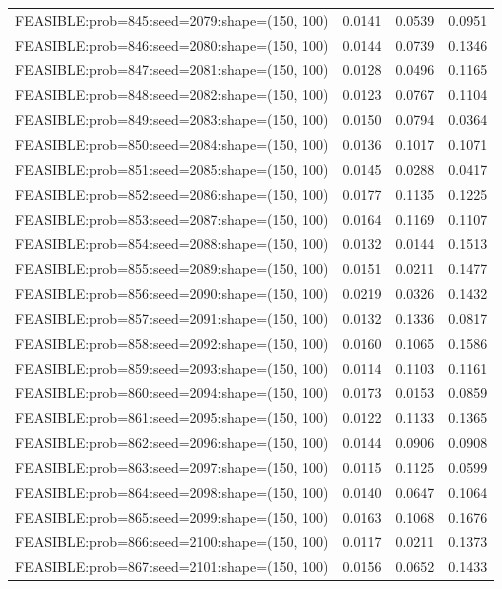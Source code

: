\begin{longtable}{lccc}
FEASIBLE:prob=845:seed=2079:shape=(150, 100) & 0.0141 & 0.0539 & 0.0951 \\
FEASIBLE:prob=846:seed=2080:shape=(150, 100) & 0.0144 & 0.0739 & 0.1346 \\
FEASIBLE:prob=847:seed=2081:shape=(150, 100) & 0.0128 & 0.0496 & 0.1165 \\
FEASIBLE:prob=848:seed=2082:shape=(150, 100) & 0.0123 & 0.0767 & 0.1104 \\
FEASIBLE:prob=849:seed=2083:shape=(150, 100) & 0.0150 & 0.0794 & 0.0364 \\
FEASIBLE:prob=850:seed=2084:shape=(150, 100) & 0.0136 & 0.1017 & 0.1071 \\
FEASIBLE:prob=851:seed=2085:shape=(150, 100) & 0.0145 & 0.0288 & 0.0417 \\
FEASIBLE:prob=852:seed=2086:shape=(150, 100) & 0.0177 & 0.1135 & 0.1225 \\
FEASIBLE:prob=853:seed=2087:shape=(150, 100) & 0.0164 & 0.1169 & 0.1107 \\
FEASIBLE:prob=854:seed=2088:shape=(150, 100) & 0.0132 & 0.0144 & 0.1513 \\
FEASIBLE:prob=855:seed=2089:shape=(150, 100) & 0.0151 & 0.0211 & 0.1477 \\
FEASIBLE:prob=856:seed=2090:shape=(150, 100) & 0.0219 & 0.0326 & 0.1432 \\
FEASIBLE:prob=857:seed=2091:shape=(150, 100) & 0.0132 & 0.1336 & 0.0817 \\
FEASIBLE:prob=858:seed=2092:shape=(150, 100) & 0.0160 & 0.1065 & 0.1586 \\
FEASIBLE:prob=859:seed=2093:shape=(150, 100) & 0.0114 & 0.1103 & 0.1161 \\
FEASIBLE:prob=860:seed=2094:shape=(150, 100) & 0.0173 & 0.0153 & 0.0859 \\
FEASIBLE:prob=861:seed=2095:shape=(150, 100) & 0.0122 & 0.1133 & 0.1365 \\
FEASIBLE:prob=862:seed=2096:shape=(150, 100) & 0.0144 & 0.0906 & 0.0908 \\
FEASIBLE:prob=863:seed=2097:shape=(150, 100) & 0.0115 & 0.1125 & 0.0599 \\
FEASIBLE:prob=864:seed=2098:shape=(150, 100) & 0.0140 & 0.0647 & 0.1064 \\
FEASIBLE:prob=865:seed=2099:shape=(150, 100) & 0.0163 & 0.1068 & 0.1676 \\
FEASIBLE:prob=866:seed=2100:shape=(150, 100) & 0.0117 & 0.0211 & 0.1373 \\
FEASIBLE:prob=867:seed=2101:shape=(150, 100) & 0.0156 & 0.0652 & 0.1433 \\

\end{longtable}
